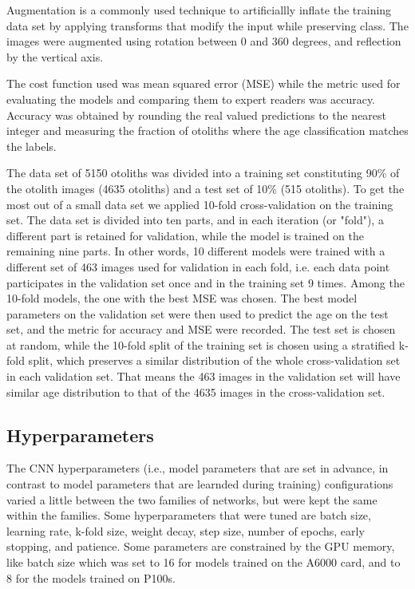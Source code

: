 \documentclass[10pt,letterpaper]{article}
\begin{document}
Augmentation is a commonly used technique to artificiallly inflate the training data set by applying transforms that modify the input while preserving class. The images were augmented using rotation between 0 and 360 degrees, and reflection by the vertical axis. 

The cost function used was mean squared error (MSE)
while the metric used for evaluating the models and comparing them to expert readers was accuracy. Accuracy was obtained by rounding the real valued predictions to the nearest integer and measuring the fraction of otoliths where the age classification matches the labels.

The data set of 5150 otoliths was divided into a training set constituting 90\% of the otolith images (4635 otoliths) and a test set of 10\% (515 otoliths).
To get the most out of a small data set we applied 10-fold cross-validation on the training set. The data set is divided into ten parts, and in each iteration (or "fold"), a different part is retained for validation, while the model is trained on the remaining nine parts. In other words, 10 different models were trained with a different set of 463 images used for validation in each fold, i.e. each data point participates in the validation set once and in the training set 9 times. Among the 10-fold models, the one with the best MSE was chosen. The best model parameters on the validation set were then used to predict the age on the test set, and the metric for accuracy and MSE were recorded. The test set is chosen at random, while the 10-fold split of the training set is chosen using a stratified k-fold split, which preserves a similar distribution of the whole cross-validation set in each validation set. That means the 463 images in the validation set will have similar age distribution to that of the 4635 images in the cross-validation set. 

\subsection{Hyperparameters}

The CNN hyperparameters (i.e., model parameters that are set in advance, in contrast to model parameters that are learnded during training) configurations varied a little between the two families of networks, but were kept the same within the families. Some hyperparameters that were tuned are batch size, learning rate, k-fold size, weight decay, step size, number of epochs, early stopping, and patience. Some parameters are constrained by the GPU memory, like batch size which
was set to 16 for models trained on the A6000 card, and to 8 for the models trained on P100s.
\end{document}
